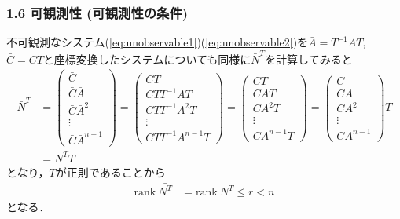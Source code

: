 \begin{frame}[t]
\frametitle{1.6 可観測性 (可観測性の条件)}
不可観測なシステム(\ref{eq:unobservable1})(\ref{eq:unobservable2})を$\bar{A}= T^{-1} A T$, $\bar{C} = C T$と座標変換したシステムについても同様に$\bar{N}^T$を計算してみると
\begin{align}
 \bar{N}^T
 &=
  \left(\begin{array}{c}
     \bar{C}        \\
   \bar{C} \bar{A}      \\
   \bar{C} \bar{A}^2    \\
   \vdots   \\
   \bar{C} \bar{A}^{n-1}
  \end{array}\right)
 =
  \left(\begin{array}{c}
     CT        \\
   CT T^{-1}AT      \\
   CT T^{-1}A^2T    \\
   \vdots   \\
   CT T^{-1}A^{n-1}T
  \end{array}\right)
 =
  \left(\begin{array}{c}
     C T       \\
   C A T     \\
   C A^2 T   \\
   \vdots   \\
   C A^{n-1}T
  \end{array}\right)
 =
  \left(\begin{array}{c}
         C        \\
   C A      \\
   C A^2    \\
   \vdots   \\
   C A^{n-1}
  \end{array}\right)
  T
\nonumber \\
 &= N^T T
\end{align}
となり，$T$が正則であることから
\begin{align}
 \mbox{rank}\ \bar{N^T} & = \mbox{rank}\ {N^T} \leq r < n
\end{align}
となる．
\end{frame}



